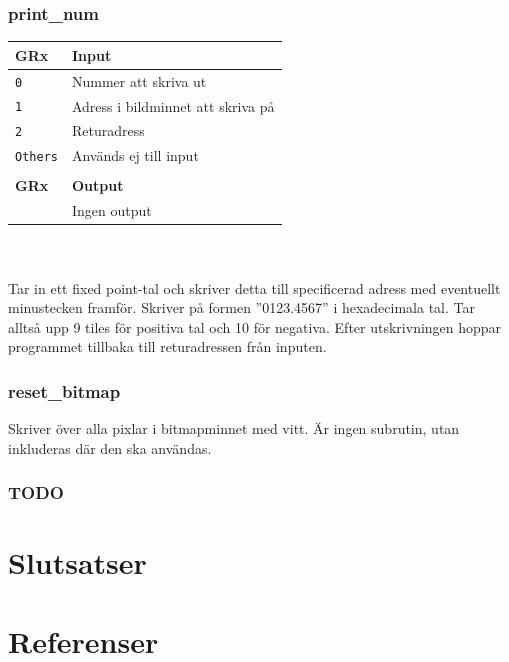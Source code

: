 \documentclass[]{article}
\begin{document}
\subsubsection{print\_num}
\begin{tabular}{ll}
	\textbf{GRx}    & \textbf{Input}                    \\ \hline
	\texttt{0}      & Nummer att skriva ut              \\
	\texttt{1}      & Adress i bildminnet att skriva på \\
	\texttt{2}      & Returadress                       \\
	\texttt{Others} & Används ej till input             \\
	                &  \\
	\textbf{GRx}    & \textbf{Output}                   \\ \hline
	                & Ingen output 						\\
\end{tabular}
\\\\
\noindent
Tar in ett fixed point-tal och skriver detta till specificerad adress med eventuellt minustecken framför. Skriver på formen ''0123.4567'' i hexadecimala tal. Tar alltså upp 9 tiles för positiva tal och 10 för negativa. Efter utskrivningen hoppar programmet tillbaka till returadressen från inputen.

\subsubsection{reset\_bitmap}
Skriver över alla pixlar i bitmapminnet med vitt. Är ingen subrutin, utan inkluderas där den ska användas.

\subsubsection{TODO}

\section{Slutsatser}
\section{Referenser}

\clearpage
\end{document}

